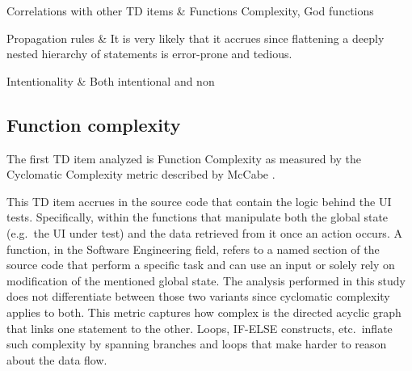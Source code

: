 \begin{table}[!htbp]
\begin{tabu}
			Correlations with other TD items & Functions Complexity, God functions\\
			\hline 	 
			
			
			
			Propagation rules & It is very likely that it accrues since flattening a deeply nested hierarchy of statements is error-prone and tedious.\\
			\hline
			
			Intentionality & Both intentional and non \\
			\hline 	 	
			
		\end{tabu}
		\label{tab:res-dry-violations}
		\caption[DRY violations specification]{DRY violations specification according to guidelines specified by \cite{mapping_study_td}.}
	\end{table}

	\subsection{Function complexity}
	
	
	The first TD item analyzed is Function Complexity as measured by the Cyclomatic Complexity metric described by McCabe \cite{cyclomatic_complexity}.

    This TD item accrues in the source code that contain the logic behind the UI tests. Specifically, within the functions that manipulate both the global state (e.g.\ the UI under test) and the data retrieved from it once an action occurs. A function, in the Software Engineering field, refers to a named section of the source code that perform a specific task and can use an input or solely rely on modification of the mentioned global state. The analysis performed in this study does not differentiate between those two variants since cyclomatic complexity applies to both. This metric captures how complex is the directed acyclic graph that links one statement to the other. Loops, IF-ELSE constructs, etc.\ inflate such complexity by spanning branches and loops that make harder to reason about the data flow.
    
